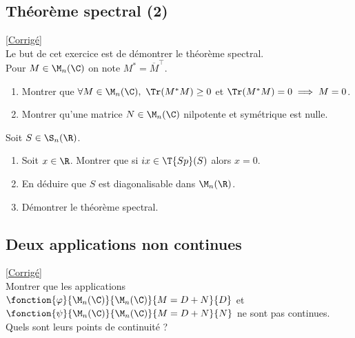 \documentclass[8pt]{book}
\begin{document}
\subsection{Théorème spectral (2) }
\label{Théorème spectral (2)}
\textcolor{blue}{\hyperref[Théorème spectral (2) corrigé]{[Corrigé]}}\\
Le but de cet exercice est de démontrer le théorème spectral.\\
Pour $M\in \M_n(\C)$ on note $M^*=\overline{M}^\top$.
\begin{enumerate}
	\item Montrer que $\forall M\in \M_n(\C),\ \Tr(M^*M)\geq 0$ et $\Tr(M^*M)=0\implies M=0$.
	\item Montrer qu'une matrice $N\in \M_n(\C)$ nilpotente et symétrique est nulle.
\end{enumerate}
Soit $S\in \S_n(\R)$.
\begin{enumerate}[resume]
	\item Soit $x\in \R$. Montrer que si $ix\in \T{Sp}(S)$ alors $x=0$.
	\item En déduire que $S$ est diagonalisable dans $\M_n(\R)$.
	\item Démontrer le théorème spectral.
\end{enumerate}

\subsection{Deux applications non continues}
\label{Deux applications non continues}
\textcolor{blue}{\hyperref[Deux applications non continues corrigé]{[Corrigé]}}\\
Montrer que les applications $\fonction{\varphi}{\M_n(\C)}{\M_n(\C)}{M=D+N}{D}$ et $\fonction{\psi}{\M_n(\C)}{\M_n(\C)}{M=D+N}{N}$ ne sont pas continues. Quels sont leurs points de continuité ?
\end{document}
